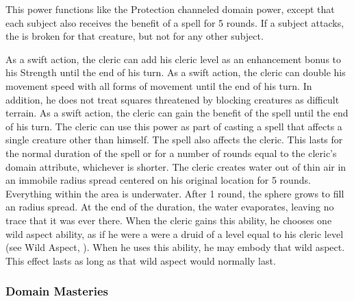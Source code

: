  This power functions like the Protection channeled domain power, except that each subject also receives the benefit of a 
spell for 5 rounds.
If a subject attacks, the  is broken for that creature, but not for any other subject.

As a swift action, the cleric can add his cleric level as an enhancement bonus to his Strength until the end of his turn.
As a swift action, the cleric can double his movement speed with all forms of movement until the end of his turn.
In addition, he does not treat squares threatened by blocking creatures as difficult terrain.
 As a swift action, the cleric can gain the benefit of the 
spell until the end of his turn.
The cleric can use this power as part of casting a spell that affects a single creature other than himself.
The spell also affects the cleric.
This lasts for the normal duration of the spell or for a number of rounds equal to the cleric's domain attribute, whichever is shorter.
The cleric creates water out of thin air in an immobile \areamed radius spread centered on his original location for 5 rounds.
Everything within the area is underwater.
After 1 round, the sphere grows to fill an \arealarge radius spread.
At the end of the duration, the water evaporates, leaving no trace that it was ever there.
When the cleric gains this ability, he chooses one wild aspect ability, as if he were a were a druid of a level equal to his cleric level (see Wild Aspect, ).
When he uses this ability, he may embody that wild aspect.
This effect lasts as long as that wild aspect would normally last.

\subsubsection{Domain Masteries}\label{Domain Masteries}

